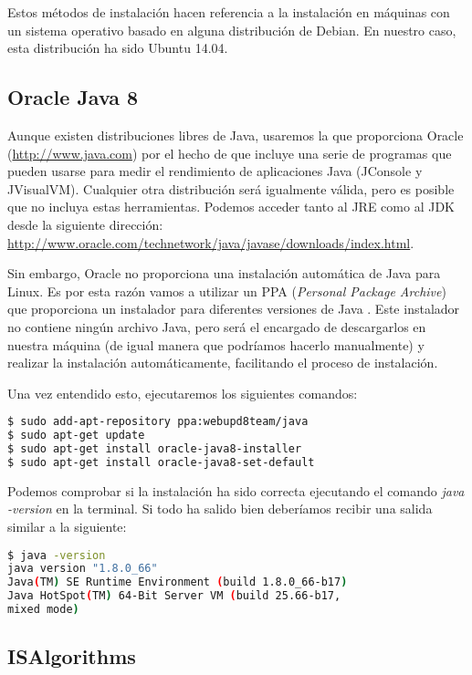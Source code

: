Estos métodos de instalación hacen referencia a la instalación en máquinas con un sistema operativo basado en alguna distribución de Debian. En nuestro caso, esta distribución ha sido Ubuntu 14.04.

\subsection{Oracle Java 8}

Aunque existen distribuciones libres de Java, usaremos la que proporciona Oracle (\url{http://www.java.com}) por el hecho de que incluye una serie de programas que pueden usarse para medir el rendimiento de aplicaciones Java (JConsole y JVisualVM). Cualquier otra distribución será igualmente válida, pero es posible que no incluya estas herramientas. Podemos acceder tanto al JRE como al JDK desde la siguiente dirección: \url{http://www.oracle.com/technetwork/java/javase/downloads/index.html}.

Sin embargo, Oracle no proporciona una instalación automática de Java para Linux. Es por esta razón vamos a utilizar un PPA (\textit{Personal Package Archive}) que proporciona un instalador para diferentes versiones de Java \cite{ppaJava}. Este instalador no contiene ningún archivo Java, pero será el encargado de descargarlos en nuestra máquina (de igual manera que podríamos hacerlo manualmente) y realizar la instalación automáticamente, facilitando el proceso de instalación.

Una vez entendido esto, ejecutaremos los siguientes comandos:

\begin{lstlisting}[language=bash]
$ sudo add-apt-repository ppa:webupd8team/java
$ sudo apt-get update
$ sudo apt-get install oracle-java8-installer
$ sudo apt-get install oracle-java8-set-default
\end{lstlisting}

Podemos comprobar si la instalación ha sido correcta ejecutando el comando \textit{java -version} en la terminal. Si todo ha salido bien deberíamos recibir una salida similar a la siguiente:

\begin{lstlisting}[language=bash]
$ java -version
java version "1.8.0_66"
Java(TM) SE Runtime Environment (build 1.8.0_66-b17)
Java HotSpot(TM) 64-Bit Server VM (build 25.66-b17,
mixed mode)
\end{lstlisting}


\subsection{ISAlgorithms}\label{subsec:InstalarISAlgorithms}

